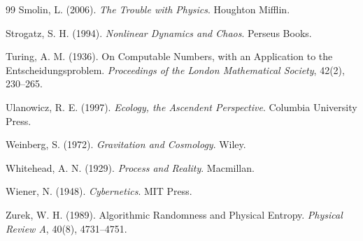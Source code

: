 \documentclass[12pt]{article}
\begin{document}
\begin{thebibliography}{99}
Smolin, L. (2006).
\textit{The Trouble with Physics}.
Houghton Mifflin.

Strogatz, S. H. (1994).
\textit{Nonlinear Dynamics and Chaos}.
Perseus Books.

Turing, A. M. (1936).
On Computable Numbers, with an Application to the Entscheidungsproblem.
\textit{Proceedings of the London Mathematical Society}, 42(2), 230--265.

Ulanowicz, R. E. (1997).
\textit{Ecology, the Ascendent Perspective}.
Columbia University Press.

Weinberg, S. (1972).
\textit{Gravitation and Cosmology}.
Wiley.

Whitehead, A. N. (1929).
\textit{Process and Reality}.
Macmillan.

Wiener, N. (1948).
\textit{Cybernetics}.
MIT Press.

Zurek, W. H. (1989).
Algorithmic Randomness and Physical Entropy.
\textit{Physical Review A}, 40(8), 4731--4751.

\end{thebibliography}
\end{document}
